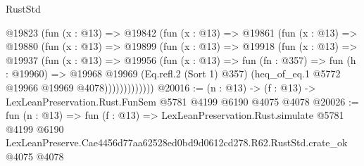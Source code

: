 \begin{lexlean}{RustStd}
\begin{coremodule}
          @19823
            (fun (x : @13) =>
            @19842
              (fun (x : @13) =>
              @19861
                (fun (x : @13) =>
                @19880
                  (fun (x : @13) =>
                  @19899
                    (fun (x : @13) =>
                    @19918
                      (fun (x : @13) =>
                      @19937
                        (fun (x : @13) =>
                        @19956
                          (fun (x : @13) =>
                          fun (fn : @357) =>
                          fun (h : @19960) =>
                          @19968
                            @19969
                            (Eq.refl.{2} (Sort 1) @357)
                            (heq_of_eq.{1} @5772 @19966 @19969 @4078)))))))))))))
@20016 := (n : @13) -> (f : @13) -> LexLeanPreservation.Rust.FunSem @5781 @4199 @6190 @4075 @4078
@20026 := fun (n : @13) =>
  fun (f : @13) =>
  LexLeanPreservation.Rust.simulate
    @5781
    @4199
    @6190
    LexLeanPreserve.Cae4456d77aa62528ed0bd9d0612cd278.R62.RustStd.crate_ok
    @4075
    @4078
\end{coremodule}
\end{lexlean}
